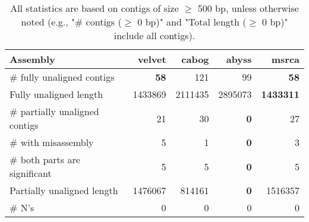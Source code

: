 \documentclass[12pt,a4paper]{article}
\begin{document}
\begin{table}[ht]
\begin{center}
\caption{All statistics are based on contigs of size $\geq$ 500 bp, unless otherwise noted (e.g., "\# contigs ($\geq$ 0 bp)" and "Total length ($\geq$ 0 bp)" include all contigs).}
\begin{tabular}{|l*{4}{|r}|}
\hline
Assembly & velvet & cabog & abyss & msrca \\ \hline
\# fully unaligned contigs & {\bf 58} & 121 & 99 & {\bf 58} \\ \hline
Fully unaligned length & 1433869 & 2111435 & 2895073 & {\bf 1433311} \\ \hline
\# partially unaligned contigs & 21 & 30 & {\bf 0} & 27 \\ \hline
\hspace{5mm}\# with misassembly & 5 & 1 & {\bf 0} & 3 \\ \hline
\hspace{5mm}\# both parts are significant & 5 & 5 & {\bf 0} & 5 \\ \hline
Partially unaligned length & 1476067 & 814161 & {\bf 0} & 1516357 \\ \hline
\# N's & 0 & 0 & 0 & 0 \\ \hline
\end{tabular}
\end{center}
\end{table}
\end{document}
